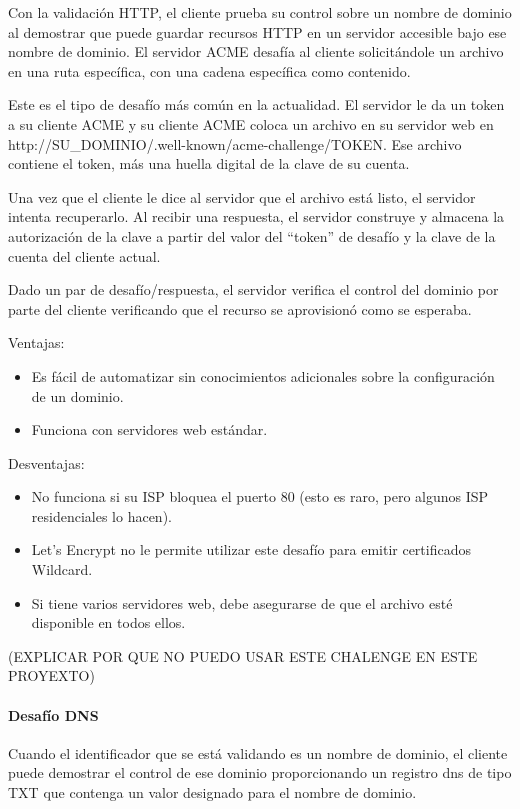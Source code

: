 Con la validación HTTP, el cliente prueba su control sobre un nombre de dominio al 
demostrar que puede guardar recursos HTTP en un servidor accesible bajo ese nombre 
de dominio. El servidor ACME desafía al cliente solicitándole un archivo en una ruta 
específica, con una cadena específica como contenido.

Este es el tipo de desafío más común en la actualidad. El servidor le da un token 
a su cliente ACME y su cliente ACME coloca un archivo en su servidor web 
en {http://\<SU\_DOMINIO\>/.well-known/acme-challenge/\<TOKEN\>}. Ese archivo contiene 
el token, más una huella digital de la clave de su cuenta.

Una vez que el cliente le dice al servidor que el archivo está listo, el servidor 
intenta recuperarlo. Al recibir una respuesta, el servidor construye y almacena la 
autorización de la clave a partir del valor del “token” de desafío y la clave de 
la cuenta del cliente actual.

Dado un par de desafío/respuesta, el servidor verifica el control del dominio por 
parte del cliente verificando que el recurso se aprovisionó como se esperaba.

Ventajas:

\begin{itemize}
   \item Es fácil de automatizar sin conocimientos adicionales sobre la configuración de un dominio.
   \item Funciona con servidores web estándar.
\end{itemize}

Desventajas:
\begin{itemize}
   \item No funciona si su ISP bloquea el puerto 80 (esto es raro, pero algunos ISP residenciales lo hacen).
   \item Let's Encrypt no le permite utilizar este desafío para emitir certificados Wildcard.
   \item Si tiene varios servidores web, debe asegurarse de que el archivo esté disponible en todos ellos.
\end{itemize}
   
(EXPLICAR POR QUE NO PUEDO USAR ESTE CHALENGE EN ESTE PROYEXTO)


\paragraph*{Desafío DNS}
Cuando el identificador que se está validando es un nombre de dominio, el cliente 
puede demostrar el control de ese dominio proporcionando un registro dns de tipo 
TXT que contenga un valor designado para el nombre de dominio.

